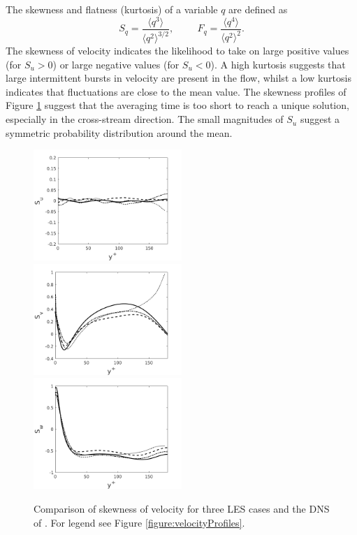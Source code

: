 \documentclass[12pt,oneside,a4paper]{article}
\begin{document}
The skewness and flatness (kurtosis) of a variable $q$ are defined as
\begin{equation}
\label{equation:skewnessAndFlatness}
S_q = \frac{\langle q^3 \rangle}{{\langle q^2 \rangle}^{3/2}}, \hspace{1cm} 
F_q = \frac{\langle q^4 \rangle}{{\langle q^2 \rangle}^2}. 
\end{equation}
The skewness of velocity indicates the likelihood to take on large positive values (for $S_u > 0$) or large negative values (for $S_u < 0$). A high kurtosis suggests that large intermittent bursts in velocity are present in the flow, whilst a low kurtosis indicates that fluctuations are close to the mean value. The skewness profiles of Figure \ref{figure:skewness} suggest that the averaging time is too short to reach a unique solution, especially in the cross-stream direction. The small magnitudes of $S_u$ suggest a symmetric probability distribution around the mean.
\begin{figure}[!t]
\centering
\includegraphics[width=0.5\textwidth]{images/S_u.png}\hfill
\includegraphics[width=0.5\textwidth]{images/S_v.png}\\
\includegraphics[width=0.5\textwidth]{images/S_w.png}
\caption{Comparison of skewness of velocity for three LES cases and the DNS of \cite{vreman2014}. For legend see Figure \ref{figure:velocityProfiles}.}
\label{figure:skewness}
\end{figure}
\end{document}
